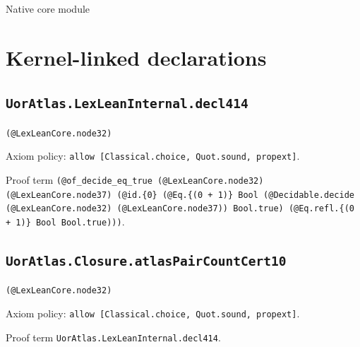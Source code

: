\documentclass[11pt]{article}
\begin{document}
\begin{center}{\LARGE Native core module}\end{center}
\section*{Kernel-linked declarations}
\subsection*{\texttt{UorAtlas.LexLeanInternal.decl414}}
\noindent\texttt{(@LexLeanCore.node32)}\par
\noindent Axiom policy: \texttt{allow [Classical.choice, Quot.sound, propext]}.\par
\noindent Proof term \texttt{(@of\_decide\_eq\_true (@LexLeanCore.node32) (@LexLeanCore.node37) (@id.\{0\} (@Eq.\{(0 + 1)\} Bool (@Decidable.decide (@LexLeanCore.node32) (@LexLeanCore.node37)) Bool.true) (@Eq.refl.\{(0 + 1)\} Bool Bool.true)))}.\par
\subsection*{\texttt{UorAtlas.Closure.atlasPairCountCert10}}
\noindent\texttt{(@LexLeanCore.node32)}\par
\noindent Axiom policy: \texttt{allow [Classical.choice, Quot.sound, propext]}.\par
\noindent Proof term \texttt{UorAtlas.LexLeanInternal.decl414}.\par
\end{document}
